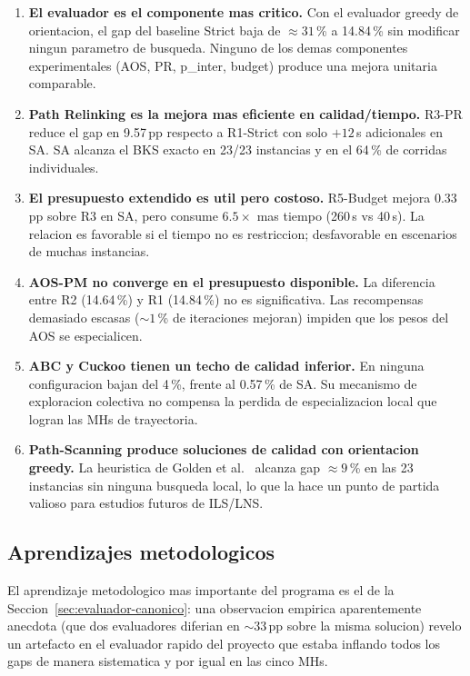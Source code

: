 \begin{enumerate}
\item \textbf{El evaluador es el componente mas critico.} Con el
  evaluador greedy de orientacion, el gap del baseline Strict baja de
  $\approx 31$\,\% a 14.84\,\% sin modificar ningun parametro de
  busqueda. Ninguno de los demas componentes experimentales (AOS, PR,
  p\_inter, budget) produce una mejora unitaria comparable.
\item \textbf{Path Relinking es la mejora mas eficiente en calidad/tiempo.}
  R3-PR reduce el gap en 9.57\,pp respecto a R1-Strict con solo
  $+12$\,s adicionales en SA. SA alcanza el BKS exacto en 23/23
  instancias y en el 64\,\% de corridas individuales.
\item \textbf{El presupuesto extendido es util pero costoso.} R5-Budget
  mejora 0.33\,pp sobre R3 en SA, pero consume $6.5\times$ mas tiempo
  (260\,s vs 40\,s). La relacion es favorable si el tiempo no es
  restriccion; desfavorable en escenarios de muchas instancias.
\item \textbf{AOS-PM no converge en el presupuesto disponible.} La
  diferencia entre R2 (14.64\,\%) y R1 (14.84\,\%) no es significativa.
  Las recompensas demasiado escasas ($\sim 1$\,\% de iteraciones mejoran)
  impiden que los pesos del AOS se especialicen.
\item \textbf{ABC y Cuckoo tienen un techo de calidad inferior.} En
  ninguna configuracion bajan del 4\,\%, frente al 0.57\,\% de SA.
  Su mecanismo de exploracion colectiva no compensa la perdida de
  especializacion local que logran las MHs de trayectoria.
\item \textbf{Path-Scanning produce soluciones de calidad con orientacion
  greedy.} La heuristica de Golden et al.~\cite{golden1983} alcanza gap $\approx 9$\,\%
  en las 23 instancias sin ninguna busqueda local, lo que la hace
  un punto de partida valioso para estudios futuros de ILS/LNS.
\end{enumerate}

\subsection{Aprendizajes metodologicos}

El aprendizaje metodologico mas importante del programa es el de la
Seccion~\ref{sec:evaluador-canonico}: una observacion empirica
aparentemente anecdota (que dos evaluadores diferian en $\sim 33$\,pp
sobre la misma solucion) revelo un artefacto en el evaluador rapido
del proyecto que estaba inflando todos los gaps de manera sistematica
y por igual en las cinco MHs.

